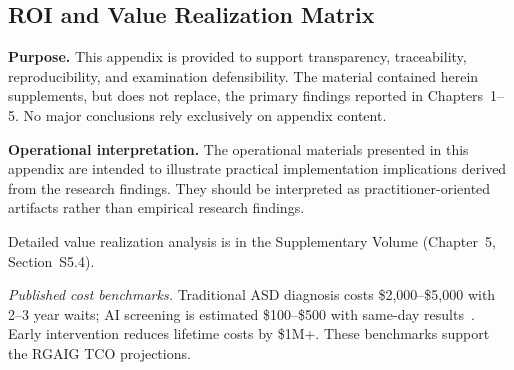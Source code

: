 \subsection{ROI and Value Realization Matrix}


\noindent\textbf{Purpose.} This appendix is provided to support transparency, traceability, reproducibility, and examination defensibility. The material contained herein supplements, but does not replace, the primary findings reported in Chapters~1--5. No major conclusions rely exclusively on appendix content.


\noindent\textbf{Operational interpretation.} The operational materials presented in this appendix are intended to illustrate practical implementation implications derived from the research findings. They should be interpreted as practitioner-oriented artifacts rather than empirical research findings.


Detailed value realization analysis is in the Supplementary Volume (Chapter~5, Section~S5.4).


\textit{Published cost benchmarks.} Traditional ASD diagnosis costs \$2,000--\$5,000 with 2--3 year waits; AI screening is estimated \$100--\$500 with same-day results~\cite{asthana2025asd_review}. Early intervention reduces lifetime costs by \$1M+. These benchmarks support the RGAIG TCO projections.


